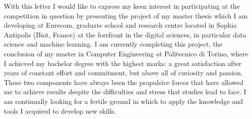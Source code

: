 \documentclass[11pt, a4paper]{awesome-cv}
\begin{document}
\makecvheader[L]


\makelettertitle

\begin{cvletter}

  
With this letter I would like to express my keen interest in participating at the competition in question by presenting the project of my master thesis which I am developing at Eurecom, graduate school and research centre located in Sophia Antipolis (Biot, France) at the forefront in the digital sciences, in particular data science and machine learning. 
I am currently completing this project, the conclusion of my master in Computer Engineering at Politecnico di Torino, where I achieved my bachelor degree with the highest marks: a great satisfaction after years of constant effort and commitment, but above all of curiosity and passion.
These two components have always been the propulsive forces that have allowed me to achieve results despite the difficulties and stress that studies lead to face. I am continually looking for a fertile ground in which to apply the knowledge and tools I acquired to develop new skills.
  

\end{cvletter}
\end{document}
